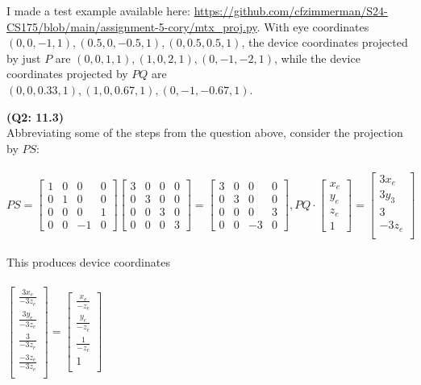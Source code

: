 \documentclass[letterpaper, 11pt]{article}
\begin{document}
\medskip
I made a test example available here: \url{https://github.com/cfzimmerman/S24-CS175/blob/main/assignment-5-cory/mtx_proj.py}. With eye coordinates $(0, 0,-1, 1), (0.5, 0, -0.5, 1), (0, 0.5, 0.5, 1)$, the device coordinates projected by just $P$ are $(0, 0, 1, 1), (1, 0, 2, 1), (0, -1, -2, 1)$, while the device coordinates projected by $PQ$ are $(0, 0, 0.33, 1), (1, 0, 0.67, 1), (0, -1, -0.67, 1)$. 

\medskip
\textbf{(Q2: 11.3)} \\ 
Abbreviating some of the steps from the question above, consider the projection by $PS$: \\ \\
$PS = \begin{bmatrix}
1 & 0 & 0 & 0 \\
0 & 1 & 0 & 0 \\
0 & 0 & 0 & 1 \\
0 & 0 & -1 & 0
\end{bmatrix} 
\begin{bmatrix}
3 & 0 & 0 & 0 \\
0 & 3 & 0 & 0 \\
0 & 0 & 3 & 0 \\
0 & 0 & 0 & 3
\end{bmatrix}
=
\begin{bmatrix}
3 & 0 & 0 & 0 \\
0 & 3 & 0 & 0 \\
0 & 0 & 0 & 3 \\
0 & 0 & -3 & 0
\end{bmatrix},
PQ \cdot 
\begin{bmatrix}
x_e  \\
y_e  \\
z_e  \\
1 
\end{bmatrix}
=
\begin{bmatrix}
3x_e  \\
3y_3 \\
3 \\
-3z_e \\ 
\end{bmatrix}$ \\ \\ 

This produces device coordinates \\ \\ 
$\begin{bmatrix}
  \frac{3x_e}{-3z_e}  \\
  \frac{3y_e}{-3z_e} \\
  \frac{3}{-3z_e} \\
  \frac{-3z_e}{-3z_e} \\ 
\end{bmatrix}
=
\begin{bmatrix}
  \frac{x_e}{-z_e}  \\
  \frac{y_e}{-z_e} \\
  \frac{1}{-z_e} \\
  1 \\ 
\end{bmatrix}$ \\ \\ 
\end{document}
